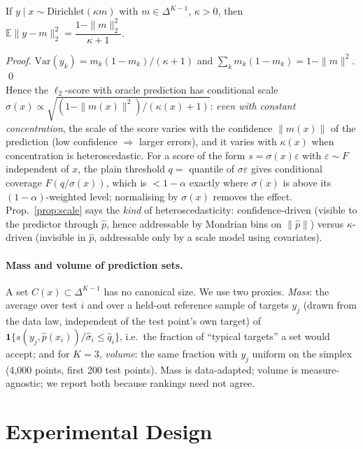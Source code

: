 \begin{proposition}\label{prop:scale}
If $y\mid x\sim\mathrm{Dirichlet}(\kappa m)$ with $m\in\Delta^{K-1}$, $\kappa>0$, then $\mathbb E\|y-m\|_2^2=\dfrac{1-\|m\|_2^2}{\kappa+1}$.
\end{proposition}
\emph{Proof.} $\mathrm{Var}(y_k)=m_k(1-m_k)/(\kappa+1)$ and $\sum_k m_k(1-m_k)=1-\|m\|^2$. \qed\\
Hence the $\ell_2$-score with oracle prediction has conditional scale $\sigma(x)\propto\sqrt{(1-\|m(x)\|^2)/(\kappa(x)+1)}$: \emph{even with constant concentration}, the scale of the score varies with the confidence $\|m(x)\|$ of the prediction (low confidence $\Rightarrow$ larger errors), and it varies with $\kappa(x)$ when concentration is heteroscedastic. For a score of the form $s=\sigma(x)\varepsilon$ with $\varepsilon\sim F$ independent of $x$, the plain threshold $q=$ quantile of $\sigma\varepsilon$ gives conditional coverage $F(q/\sigma(x))$, which is $<1-\alpha$ exactly where $\sigma(x)$ is above its $(1-\alpha)$-weighted level; normalising by $\sigma(x)$ removes the effect. Prop.~\ref{prop:scale} says the \emph{kind} of heteroscedasticity: confidence-driven (visible to the predictor through $\hat p$, hence addressable by Mondrian bins on $\|\hat p\|$) versus $\kappa$-driven (invisible in $\hat p$, addressable only by a scale model using covariates).
\paragraph{Mass and volume of prediction sets.} A set $C(x)\subset\Delta^{K-1}$ has no canonical size. We use two proxies. \emph{Mass}: the average over test $i$ and over a held-out reference sample of targets $y_j$ (drawn from the data law, independent of the test point's own target) of $\mathbf 1\{s(y_j,\hat p(x_i))/\hat\sigma_i\le\hat q_i\}$, i.e.\ the fraction of ``typical targets'' a set would accept; and for $K=3$, \emph{volume}: the same fraction with $y_j$ uniform on the simplex (4{,}000 points, first 200 test points). Mass is data-adapted; volume is measure-agnostic; we report both because rankings need not agree.

\section{Experimental Design}\label{sec:design}
